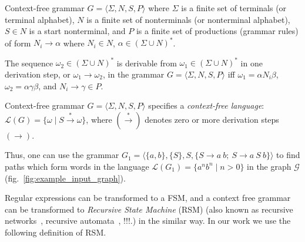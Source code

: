\begin{definition} 
Context-free grammar $G = \langle\Sigma, N, S, P\rangle$ where $\Sigma$ is a finite set of terminals (or terminal alphabet), $N$ is a finite set of nonterminals (or nonterminal alphabet), $S \in N$ is a start nonterminal, and $P$ is a finite set of productions (grammar rules) of form $N_i \to \alpha$ where  $N_i \in N$, $\alpha \in (\Sigma \cup N)^*$.
\end{definition}

\begin{definition}
The sequence $\omega_2 \in (\Sigma \cup N)^*$ is derivable from $\omega_1 \in (\Sigma \cup N)^*$ in one derivation step, or $\omega_1 \to \omega_2$, in the grammar $G = \langle\Sigma, N, S, P\rangle$ iff $\omega_1=\alpha N_i \beta$, $\omega_2 = \alpha \gamma \beta$, and $N_i \to \gamma \in P$.
\end{definition}

\begin{definition}
Context-free grammar $G=\langle\Sigma, N, S, P\rangle$ specifies a \textit{context-free language}: $\mathcal{L}(G) = \{\omega \mid S \xrightarrow{*} \omega \}$, where $(\xrightarrow{*})$ denotes zero or more derivation steps $(\to)$.    
\end{definition}

Thus, one can use the grammar $G_1 = \langle \{a,b\}, \{S\}, S, \{S \to a \ b; \ S \to a \ S \ b\} \rangle$ to find paths which form words in the language $\mathcal{L}(G_1) = \{a^n b^n \mid n > 0\}$ in the graph $\mathcal{G}$ (fig.~\ref{fig:example_input_graph}).

Regular expressions can be transformed to a FSM, and a context free grammar can be transformed to \textit{Recursive State Machine} (RSM) (also known as recursive networks~\cite{!!!}, recursive automata~\cite{!!!}, !!!.) in the similar way.
In our work we use the following definition of RSM.


